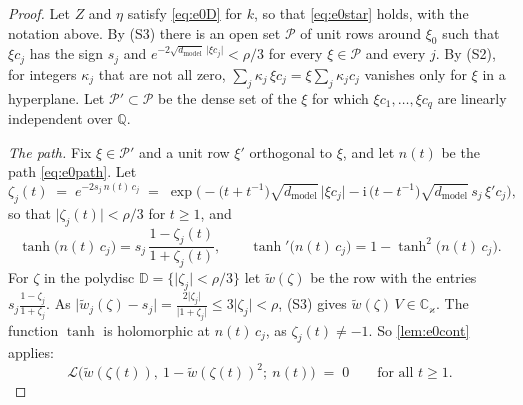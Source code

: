 \documentclass[10pt]{article}
\theoremstyle{definition}
\theoremstyle{remark}
\newcommand{\dm}{d_{\mathrm{model}}}
\begin{document}
\begin{proof}
Let $Z$ and $\eta$ satisfy \eqref{eq:e0D} for $k$, so that \eqref{eq:e0star} holds, with the notation above. By (S3) there is an open set $\mathcal P$ of unit rows around $\xi_0$ such that $\xi c_j$ has the sign $s_j$ and $e^{-2\sqrt{\dm}\,\lvert\xi c_j\rvert} < \rho/3$ for every $\xi \in \mathcal P$ and every $j$. By (S2), for integers $\kappa_j$ that are not all zero, $\sum_j\kappa_j\,\xi c_j = \xi\sum_j\kappa_jc_j$ vanishes only for $\xi$ in a hyperplane. Let $\mathcal P' \subset \mathcal P$ be the dense set of the $\xi$ for which $\xi c_1, \dots, \xi c_q$ are linearly independent over $\mathbb Q$.

\emph{The path.} Fix $\xi \in \mathcal P'$ and a unit row $\xi'$ orthogonal to $\xi$, and let $n(t)$ be the path \eqref{eq:e0path}. Let
\[
\zeta_j(t) \;=\; e^{-2s_j\,n(t)\,c_j} \;=\; \exp\Big(-\big(t + t^{-1}\big)\sqrt{\dm}\,\lvert\xi c_j\rvert - \mathrm i\,\big(t - t^{-1}\big)\sqrt{\dm}\,s_j\,\xi'c_j\Big),
\]
so that $\lvert\zeta_j(t)\rvert < \rho/3$ for $t \ge 1$, and
\[
\tanh\big(n(t)\,c_j\big) = s_j\,\frac{1 - \zeta_j(t)}{1 + \zeta_j(t)}, \qquad \tanh'\big(n(t)\,c_j\big) = 1 - \tanh^2\big(n(t)\,c_j\big).
\]
For $\zeta$ in the polydisc $\mathbb D = \{\lvert\zeta_j\rvert < \rho/3\}$ let $\tilde w(\zeta)$ be the row with the entries $s_j\frac{1 - \zeta_j}{1 + \zeta_j}$. As $\lvert\tilde w_j(\zeta) - s_j\rvert = \frac{2\lvert\zeta_j\rvert}{\lvert1 + \zeta_j\rvert} \le 3\lvert\zeta_j\rvert < \rho$, (S3) gives $\tilde w(\zeta)\,V \in \mathbb C_\varkappa$. The function $\tanh$ is holomorphic at $n(t)\,c_j$, as $\zeta_j(t) \neq -1$. So \cref{lem:e0cont} applies:
\begin{equation}\label{eq:e0tanhpath}
\mathcal L\big(\tilde w(\zeta(t)),\ 1 - \tilde w(\zeta(t))^2;\ n(t)\big) \;=\; 0 \qquad\text{for all } t \ge 1 .
\end{equation}


\end{proof}
\end{document}
